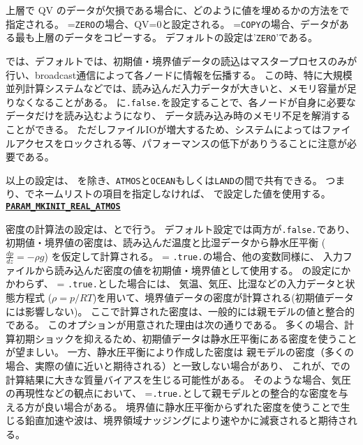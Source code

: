 上層で QV のデータが欠損である場合に、どのように値を埋めるかの方法をで指定される。
=\verb|ZERO|の場合、QV=0と設定される。
=\verb|COPY|の場合、データがある最も上層のデータをコピーする。
デフォルトの設定は'\verb|ZERO|'である。


\scalerm では、デフォルトでは、初期値・境界値データの読込はマスタープロセスのみが行い、broadcast通信によって各ノードに情報を伝播する。
この時、特に大規模並列計算システムなどでは、読み込んだ入力データが大きいと、メモリ容量が足りなくなることがある。
に\verb|.false.|を設定することで、各ノードが自身に必要なデータだけを読み込むようになり、
データ読み込み時のメモリ不足を解消することができる。
ただしファイルIOが増大するため、システムによってはファイルアクセスをロックされる等、パフォーマンスの低下がありうることに注意が必要である。


以上の設定は、 を除き、\verb|ATMOS|と\verb|OCEAN|もしくは\verb|LAND|の間で共有できる。
つまり、でネームリストの項目を指定しなければ、
で設定した値を使用する。
\\

\noindent\textbf{\underline{\texttt{PARAM\_MKINIT\_REAL\_ATMOS}}}

密度の計算法の設定は、とで行う。
デフォルト設定では両方が\verb|.false.|であり、
初期値・境界値の密度は、読み込んだ温度と比湿データから静水圧平衡 ($\frac{dp}{dz}=-\rho g$) を仮定して計算される。
 = \verb|.true.|の場合、他の変数同様に、
入力ファイルから読み込んだ密度の値を初期値・境界値として使用する。
の設定にかかわらず、 = \verb|.true.|とした場合には、
気温、気圧、比湿などの入力データと状態方程式 ($\rho = p/RT$)を用いて、境界値データの密度が計算される(初期値データには影響しない)。
ここで計算された密度は、一般的には親モデルの値と整合的である。
このオプションが用意された理由は次の通りである。
多くの場合、計算初期ショックを抑えるため、初期値データは静水圧平衡にある密度を使うことが望ましい。
一方、静水圧平衡により作成した密度は
親モデルの密度（多くの場合、実際の値に近いと期待される）と一致しない場合があり、
これが、\scalerm での計算結果に大きな質量バイアスを生じる可能性がある。
そのような場合、気圧の再現性などの観点において、
=\verb|.true.|として親モデルとの整合的な密度を与える方が良い場合がある。
境界値に静水圧平衡からずれた密度を使うことで生じる鉛直加速や波は、境界領域ナッジングにより速やかに減衰されると期待される。


